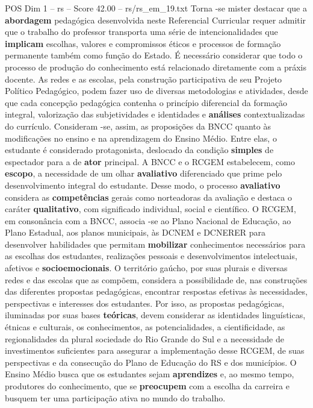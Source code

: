 \begin{textsample}{POS Dim 1 – rs – Score 42.00 – rs/rs\_em\_19.txt}
Torna -se mister destacar que a \textbf{abordagem} pedagógica desenvolvida neste Referencial Curricular requer admitir que o trabalho do professor transporta uma série de intencionalidades que \textbf{implicam} escolhas, valores e compromissos éticos e processos de formação permanente também como função do Estado.
É necessário considerar que todo o processo de produção do conhecimento está relacionado diretamente com a práxis docente.
As redes e as escolas, pela construção participativa de seu Projeto Político Pedagógico, podem fazer uso de diversas metodologias e atividades, desde que cada concepção pedagógica contenha o princípio diferencial da formação integral, valorização das subjetividades e identidades e \textbf{análises} contextualizadas do currículo.
Consideram -se, assim, as proposições da BNCC quanto às modificações no ensino e na aprendizagem do Ensino Médio.
Entre elas, o estudante é considerado protagonista, deslocado da condição \textbf{simples} de espectador para a de \textbf{ator} principal.
A BNCC e o RCGEM estabelecem, como \textbf{escopo}, a necessidade de um olhar \textbf{avaliativo} diferenciado que prime pelo desenvolvimento integral do estudante.
Desse modo, o processo \textbf{avaliativo} considera as \textbf{competências} gerais como norteadoras da avaliação e destaca o caráter \textbf{qualitativo}, com significado individual, social e científico.
O RCGEM, em consonância com a BNCC, associa -se ao Plano Nacional de Educação, ao Plano Estadual, aos planos municipais, às DCNEM e DCNERER para desenvolver habilidades que permitam \textbf{mobilizar} conhecimentos necessários para as escolhas dos estudantes, realizações pessoais e desenvolvimentos intelectuais, afetivos e \textbf{socioemocionais}.
O território gaúcho, por suas plurais e diversas redes e das escolas que as compõem, considera a possibilidade de, nas construções das diferentes propostas pedagógicas, encontrar respostas efetivas às necessidades, perspectivas e interesses dos estudantes.
Por isso, as propostas pedagógicas, iluminadas por suas bases \textbf{teóricas}, devem considerar as identidades linguísticas, étnicas e culturais, os conhecimentos, as potencialidades, a cientificidade, as regionalidades da plural sociedade do Rio Grande do Sul e a necessidade de investimentos suficientes para assegurar a implementação desse RCGEM, de suas perspectivas e da consecução do Plano de Educação do RS e dos municípios.
O Ensino Médio busca que os estudantes sejam \textbf{aprendizes} e, ao mesmo tempo, produtores do conhecimento, que se \textbf{preocupem} com a escolha da carreira e busquem ter uma participação ativa no mundo do trabalho.

\end{textsample}
